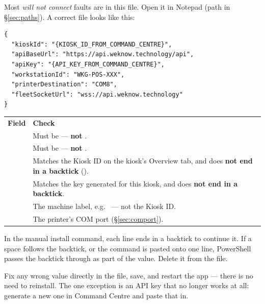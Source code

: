\documentclass[a4paper,10pt]{article}
\begin{document}
Most \emph{will not connect} faults are in this file. Open it in Notepad
(path in \S\ref{sec:paths}). A correct file looks like this:

\begin{lstlisting}
{
  "kioskId": "{KIOSK_ID_FROM_COMMAND_CENTRE}",
  "apiBaseUrl": "https://api.weknow.technology/api",
  "apiKey": "{API_KEY_FROM_COMMAND_CENTRE}",
  "workstationId": "WKG-POS-XXX",
  "printerDestination": "COM8",
  "fleetSocketUrl": "wss://api.weknow.technology"
}
\end{lstlisting}

\begin{center}
\renewcommand{\arraystretch}{1.35}\small
\begin{tabularx}{\textwidth}{L{34mm} X}
\color{white}\textbf{Field} &
\color{white}\textbf{Check}\\
 &
Must be  --- \textbf{not}
.\\
 &
Must be  --- \textbf{not}
.\\
 &
Matches the Kiosk ID on the kiosk's Overview tab, and does \textbf{not end
in a backtick} ().\\
 &
Matches the key generated for this kiosk, and does \textbf{not end in a
backtick}.\\
 &
The machine label, e.g.\  --- not the Kiosk ID.\\
 &
The printer's COM port (\S\ref{sec:comport}).\\
\end{tabularx}
\end{center}

\begin{wkwarn}
In the manual install command, each line ends in a backtick to continue
it. If a space follows the backtick, or the command is pasted onto one
line, PowerShell passes the backtick through as part of the value. Delete
it from the file.
\end{wkwarn}

Fix any wrong value directly in the file, save, and restart the app ---
there is no need to reinstall. The one exception is an API key that no
longer works at all: generate a new one in Command Centre and paste that in.
\end{document}
